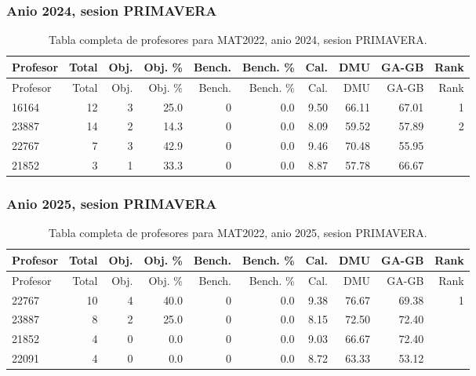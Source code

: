 \subsubsection{Anio 2024, sesion PRIMAVERA}

\begingroup
\scriptsize
\setlength{\tabcolsep}{3pt}
\begin{longtable}{lrrrrrrrrr}
\caption{Tabla completa de profesores para MAT2022, anio 2024, sesion PRIMAVERA.}\label{tab:prof-period-mat2022-2024-primavera}\\
\toprule
Profesor & Total & Obj. & Obj. \% & Bench. & Bench. \% & Cal. & DMU & GA-GB & Rank \\
\midrule
\endfirsthead
\toprule
Profesor & Total & Obj. & Obj. \% & Bench. & Bench. \% & Cal. & DMU & GA-GB & Rank \\
\midrule
\endhead
16164 & 12 & 3 & 25.0 & 0 & 0.0 & 9.50 & 66.11 & 67.01 & 1 \\
23887 & 14 & 2 & 14.3 & 0 & 0.0 & 8.09 & 59.52 & 57.89 & 2 \\
22767 & 7 & 3 & 42.9 & 0 & 0.0 & 9.46 & 70.48 & 55.95 &  \\
21852 & 3 & 1 & 33.3 & 0 & 0.0 & 8.87 & 57.78 & 66.67 &  \\
\bottomrule
\end{longtable}
\endgroup

\subsubsection{Anio 2025, sesion PRIMAVERA}

\begingroup
\scriptsize
\setlength{\tabcolsep}{3pt}
\begin{longtable}{lrrrrrrrrr}
\caption{Tabla completa de profesores para MAT2022, anio 2025, sesion PRIMAVERA.}\label{tab:prof-period-mat2022-2025-primavera}\\
\toprule
Profesor & Total & Obj. & Obj. \% & Bench. & Bench. \% & Cal. & DMU & GA-GB & Rank \\
\midrule
\endfirsthead
\toprule
Profesor & Total & Obj. & Obj. \% & Bench. & Bench. \% & Cal. & DMU & GA-GB & Rank \\
\midrule
\endhead
22767 & 10 & 4 & 40.0 & 0 & 0.0 & 9.38 & 76.67 & 69.38 & 1 \\
23887 & 8 & 2 & 25.0 & 0 & 0.0 & 8.15 & 72.50 & 72.40 &  \\
21852 & 4 & 0 & 0.0 & 0 & 0.0 & 9.03 & 66.67 & 72.40 &  \\
22091 & 4 & 0 & 0.0 & 0 & 0.0 & 8.72 & 63.33 & 53.12 &  \\
\bottomrule
\end{longtable}
\endgroup